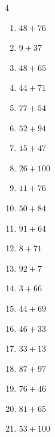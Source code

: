 \begin{multicols}{4}
\begin{enumerate}
  \item $48+76$
        \phantom{$=124$}

  \item $9+37$
        \phantom{$=46$}

  \item $48+65$
        \phantom{$=113$}

\columnbreak %

  \item $44+71$
        \phantom{$=115$}

  \item $77+54$
        \phantom{$=131$}

  \item $52+94$
        \phantom{$=146$}

  \item $15+47$
        \phantom{$=62$}

  \item $26+100$
        \phantom{$=126$}

  \item $11+76$
        \phantom{$=87$}

  \item $50+84$
        \phantom{$=134$}

  \item $91+64$
        \phantom{$=155$}

  \item $8+71$
        \phantom{$=79$}

  \item $92+7$
        \phantom{$=99$}

  \item $3+66$
        \phantom{$=69$}

  \item $44+69$
        \phantom{$=113$}

  \item $46+33$
        \phantom{$=79$}

  \item $33+13$
        \phantom{$=46$}

  \item $87+97$
        \phantom{$=184$}

  \item $76+46$
        \phantom{$=122$}

  \item $81+65$
        \phantom{$=146$}

  \item $53+100$
        \phantom{$=153$}


\end{enumerate}
\end{multicols}
